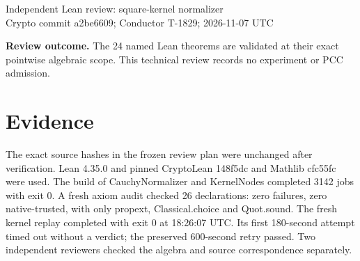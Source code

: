 \documentclass[10pt]{article}
\begin{document}
\begin{center}
{\LARGE Independent Lean review: square-kernel normalizer}\\[5pt]
{\small Crypto commit a2be6609; Conductor T-1829; 2026-11-07 UTC}
\end{center}
\textbf{Review outcome.} The 24 named Lean theorems are validated at their exact pointwise algebraic scope. This technical review records no experiment or PCC admission.
\section*{Evidence}
The exact source hashes in the frozen review plan were unchanged after verification. Lean 4.35.0 and pinned CryptoLean 148f5dc and Mathlib cfc55fc were used. The build of CauchyNormalizer and KernelNodes completed 3142 jobs with exit 0. A fresh axiom audit checked 26 declarations: zero failures, zero native-trusted, with only propext, Classical.choice and Quot.sound. The fresh kernel replay completed with exit 0 at 18:26:07 UTC. Its first 180-second attempt timed out without a verdict; the preserved 600-second retry passed. Two independent reviewers checked the algebra and source correspondence separately.
\end{document}
